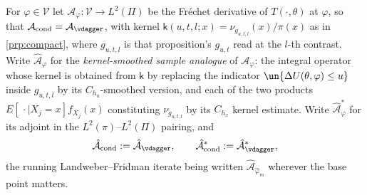 \begin{definition}\label{def:hatA}
For $\varphi\in\mathcal V$ let $\mathcal A_\varphi:\mathcal V\to L^{2}(\Pi)$ be the Fr\'echet derivative of
$T(\cdot,\theta)$ at $\varphi$, so that $\mathcal A_{\mathrm{cond}}=\mathcal A_{\vdagger}$, with kernel
$\mathsf k(u,t,l;x)=\nu_{g_{u,t,l}}(x)/\pi(x)$ as in \cref{prp:compact}, where
$g_{u,t,l}$ is that proposition's $g_{u,t}$ read at the $l$-th contrast.
Write $\hat{\mathcal A}_\varphi$ for
the \emph{kernel-smoothed sample analogue} of $\mathcal A_\varphi$: the integral operator whose kernel is
obtained from $\mathsf k$ by replacing the indicator $\un\{\Delta U(\theta,\varphi)\le u\}$ inside
$g_{u,t,l}$ by its $C_{h_u}$-smoothed version, and each of the two products
$E[\,\cdot\mid X_j=x]f_{X_j}(x)$ constituting $\nu_{g_{u,t,l}}$ by its $C_{h_x}$ kernel estimate. Write
$\hat{\mathcal A}^\ast_\varphi$ for its adjoint in the $L^{2}(\pi)$--$L^{2}(\Pi)$ pairing, and
\[
\hat{\mathcal A}_{\mathrm{cond}}:=\hat{\mathcal A}_{\vdagger},
\qquad
\hat{\mathcal A}^\ast_{\mathrm{cond}}:=\hat{\mathcal A}^\ast_{\vdagger},
\]
the running Landweber--Fridman iterate being written $\hat{\mathcal A}_{\hat\varphi_m}$ wherever the base
point matters.

\end{definition}



